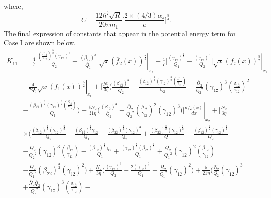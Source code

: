 \documentclass[fleqn]{article}
\begin{document}
        where,
         \begin{equation}
            C = \frac{12\hbar^2\sqrt{R}}{20 \pi m_1}\biggl[\frac{2\times(4/3)\alpha_s}{a}\biggr]^\frac{5}{2}.
            \label{eqn:expression_of_C}
        \end{equation}    
            The final expression of constants that appear in the potential energy term for Case I are shown below.
            \begin{equation}
                \begin{split}
                    K_{11} & = \frac{4}{7} \biggl[ \frac{ \left(\frac{\beta_{1\overline{2}}}{\gamma_{12}}\right)^\frac{5}{2} (\gamma_{12})^3}{Q_2} - \left. \frac{(\beta_{1\overline{2}})^3}{\overline{Q}_{2}} \biggr] \sqrt{x} (\overline{f}_{2}(x))^\frac{5}{2} \right|_{\overline{x}_{2}} + \left. \frac{4}{7} \biggl[\frac{(\gamma_{12})^\frac{5}{2}}{Q_1} - \frac{(\gamma_{12})^3}{Q_2} \biggr] \sqrt{x} (f_2(x))^\frac{5}{2} \right|_{x_2} \\ &  -\left. \frac{4}{7 Q_1} \sqrt{x} (f_1(x))^\frac{5}{2} \right|_{x_1}  + \Biggl[ \frac{\overline{N}_{2}}{3 \eta} \Biggl( \frac{(\beta_{1\overline{2}})^3}{\overline{Q}_{2}}  - \frac{(\beta_{1\overline{2}})^\frac{3}{2} (\gamma_{12})^\frac{3}{2}  \left(\frac{\beta_{1\overline{2}}}{\gamma_{12}}\right)}{Q_2} + \frac{\overline{Q}_{2}}{{Q_2}^2} (\gamma_{12})^3  \left(\frac{\beta_{1\overline{2}}}{\gamma_{12}}\right)^2 \\ & - \frac{(\beta_{1\overline{2}})^\frac{3}{2} (\gamma_{12})^\frac{3}{2}  \left(\frac{\beta_{1\overline{2}}}{\gamma_{12}}\right)}{Q_2} \Biggr) + \frac{5 \overline{N}_{2}}{21 \eta} \Biggl( \frac{(\beta_{1\overline{2}})^3}{\overline{Q}_{2}}   - \left. \frac{\overline{Q}_{2}}{{Q_2}^2}  \left(\frac{\beta_{1\overline{2}}}{\gamma_{12}}\right)^2 (\gamma_{12})^3 \Biggr) \Biggr] \frac{d\overline{f}_{2}(x)}{dx} \right|_{\overline{x}_{2}}  + \Biggl[ \frac{\overline{N}_{2}}{3 \eta} \\ & \times \Biggl( \frac{(\beta_{1\overline{2}})^\frac{3}{2} (\gamma_{12})^\frac{3}{2}}{Q_2} - \frac{(\beta_{1\overline{2}})^\frac{3}{2} \gamma_{12}}{Q_1} - \frac{(\beta_{2\overline{2}})^\frac{3}{2}(\gamma_{12})^3}{Q_2} + \frac{(\beta_{2\overline{2}})^\frac{3}{2} (\gamma_{12})^\frac{5}{2}}{Q_1}   + \frac{(\beta_{1\overline{2}})^\frac{3}{2} (\gamma_{12})^\frac{3}{2}}{Q_2} \\ & - \frac{\overline{Q}_{2}}{{Q_2}^2} (\gamma_{12})^3  \left(\frac{\beta_{1\overline{2}}}{\gamma_{12}}\right) - \frac{(\beta_{1\overline{2}})^\frac{3}{2} \gamma_{12}}{Q_1}  + \frac{(\gamma_{12})^\frac{5}{2} (\beta_{2\overline{2}})^\frac{3}{2}}{Q_1} + \frac{\overline{Q}_{2}}{{Q_1}^2} (\gamma_{12})^2  \left(\frac{\beta_{1\overline{2}}}{\gamma_{12}}\right) \\ & - \frac{Q_2}{{Q_1}^2} (\beta_{2\overline{2}})^\frac{3}{2} (\gamma_{12})^2 \Biggr)  + \frac{N_2}{3 \eta} \Biggl( \frac{(\gamma_{12})^3}{Q_2} - \frac{2(\gamma_{12})^\frac{5}{2}}{Q_1} + \frac{Q_2}{{Q_1}^2} (\gamma_{12})^2 \Biggr)  + \frac{5}{21 \eta} \Biggl(\frac{N_2}{Q_2} (\gamma_{12})^3 \\ & + \frac{\overline{N}_{2} \overline{Q}_{2}}{{Q_2}^2}(\gamma_{12})^3 \left(\frac{\beta_{1\overline{2}}}{\gamma_{12}}\right) - 
\end{split}
\end{equation}
\end{document}
